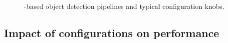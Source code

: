 

\begin{figure}[t]
    \centering
    \hspace{-0.5cm}
    \caption{\nn-based object detection pipelines and typical configuration
    knobs.}
    \label{fig:pipelines}
\end{figure}

\subsection{Impact of configurations on performance}
\label{subsec:profile}

